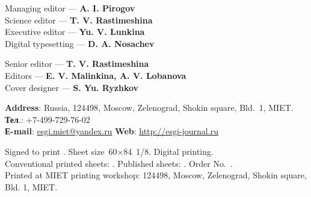 \begin{otherlanguage}{english}
\noindent
\begin{minipage}[t]{.48\textwidth}
    
\begin{flushleft}
  \scriptsize
        Managing editor — \textbf{A. I. Pirogov}\\
Science editor — \textbf{T. V. Rastimeshina} \\
Executive editor — \textbf{Yu. V. Lunkina }\\
Digital typesetting — \textbf{D. A. Nosachev}
    \end{flushleft}
\end{minipage}\hspace{0.04\textwidth}
\begin{minipage}[t]{.48\textwidth}
    \begin{flushleft}
        \scriptsize
        Senior editor — \textbf{T. V. Rastimeshina}\\
        Editors — \textbf{E. V. Malinkina, A. V. Lobanova}\\
        Cover designer — \textbf{S. Yu. Ryzhkov}
    \end{flushleft}
\end{minipage}

\begin{flushleft}
    \scriptsize
    \textbf{Address}: Russia, 124498, Moscow, Zelenograd, Shokin square, Bld. 1, MIET.\\
    \textbf{Тел}.: +7-499-729-76-02\\
    \textbf{Е-mail}: \href{mailto:esgi.miet@yandex.ru}{esgi.miet@yandex.ru} \hspace{3em}
    \textbf{Web}: \url{http://esgi-journal.ru}

     \vspace{1em}
    Signed to print \esgiPDate. Sheet size 60\(×\)84 1/8. Digital printing.\\
    Conventional printed sheets: \esgiUPL{}. Published sheets: \esgiUIL{}. Order No.~\esgiPRN{}.\\
    Printed at MIET printing workshop: 124498, Moscow, Zelenograd, Shokin square, Bld. 1, MIET.
\end{flushleft}

\end{otherlanguage}

\normalsize
\setmainlinespread

\restoregeometry
